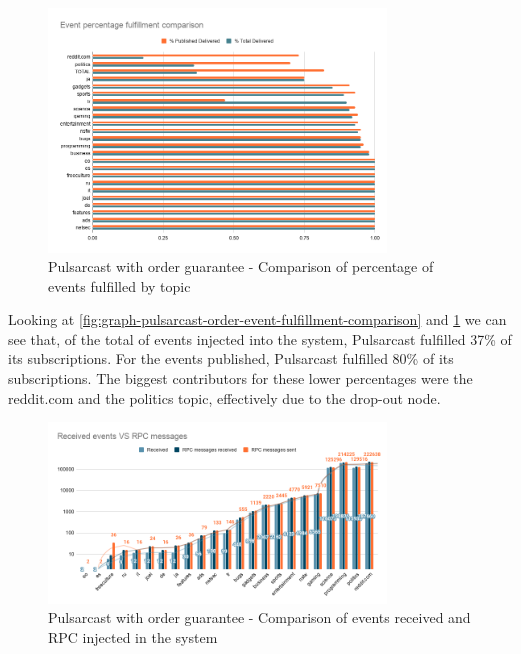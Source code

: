 \begin{figure}[!htb]
  \centering
  \includegraphics[width=0.8\textwidth]{img/graph-pulsarcast-order-event-percentage-fulfillment-comparison.png}
  \caption{Pulsarcast with order guarantee - Comparison of percentage of events fulfilled by topic}
  \label{fig:graph-pulsarcast-order-event-percentage-fulfillment-comparison}
\end{figure}

Looking at \ref{fig:graph-pulsarcast-order-event-fulfillment-comparison} and
\ref{fig:graph-pulsarcast-order-event-percentage-fulfillment-comparison} we can
see that, of the total of events injected into the system, Pulsarcast fulfilled
37\% of its subscriptions. For the events published, Pulsarcast fulfilled 80\%
of its subscriptions. The biggest contributors for these lower percentages were
the reddit.com and the politics topic, effectively due to the drop-out node.

\begin{figure}[!htb]
  \centering
  \includegraphics[width=0.8\textwidth]{img/graph-pulsarcast-order-rpc.png}
  \caption{Pulsarcast with order guarantee - Comparison of events received and RPC injected in the system}
  \label{fig:graph-pulsarcast-order-rpc}
\end{figure}

